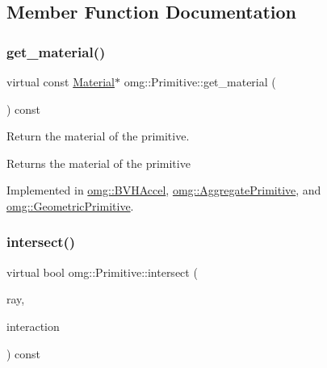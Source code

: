 \subsection{Member Function Documentation}
\mbox{\label{classomg_1_1_primitive_ad9cb98c6f74581d53cadf800fc506333}} 
\subsubsection{\texorpdfstring{get\_material()}{get\_material()}}
{\footnotesize\ttfamily virtual const \mbox{\hyperlink{classomg_1_1_material}{Material}}$\ast$ omg\+::\+Primitive\+::get\+\_\+material (\begin{DoxyParamCaption}{ }\end{DoxyParamCaption}) const\hspace{0.3cm}{\ttfamily [pure virtual]}}



Return the material of the primitive. 

\begin{DoxyReturn}{Returns}
the material of the primitive 
\end{DoxyReturn}


Implemented in \mbox{\hyperlink{classomg_1_1_b_v_h_accel_afc47144553f2de1a23c4053e56747eee}{omg\+::\+B\+V\+H\+Accel}}, \mbox{\hyperlink{classomg_1_1_aggregate_primitive_a339e9fe3ab8e2c0c68c888345b834c21}{omg\+::\+Aggregate\+Primitive}}, and \mbox{\hyperlink{classomg_1_1_geometric_primitive_ae7b7b9ed0a5fc336a3111ef16a09f27a}{omg\+::\+Geometric\+Primitive}}.

\mbox{\label{classomg_1_1_primitive_a51f78d3f52794ae02e18688dff75414c}} 
\subsubsection{\texorpdfstring{intersect()}{intersect()}\hspace{0.1cm}{\footnotesize\ttfamily [1/2]}}
{\footnotesize\ttfamily virtual bool omg\+::\+Primitive\+::intersect (\begin{DoxyParamCaption}\item[{const \mbox{\hyperlink{classomg_1_1_ray}{Ray}} \&}]{ray,  }\item[{\mbox{\hyperlink{classomg_1_1_surface_interaction}{Surface\+Interaction}} $\ast$}]{interaction }\end{DoxyParamCaption}) const\hspace{0.3cm}{\ttfamily [pure virtual]}}



